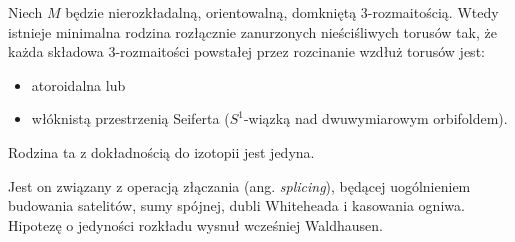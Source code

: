 \begin{proposition}
    Niech $M$ będzie nierozkładalną, orientowalną, domkniętą 3-rozmaitością.
    Wtedy istnieje minimalna rodzina rozłącznie zanurzonych nieściśliwych torusów tak, że każda składowa 3-rozmaitości powstałej przez rozcinanie wzdłuż torusów jest:
    \begin{itemize}
        \item atoroidalna lub
    \item włóknistą przestrzenią Seiferta ($S^1$-wiązką nad dwuwymiarowym orbifoldem).    \end{itemize}
%
%
%
%
%
    Rodzina ta z dokładnością do izotopii jest jedyna.
\end{proposition}

Jest on związany z operacją złączania (ang. \emph{splicing}), będącej uogólnieniem budowania satelitów, sumy spójnej, dubli Whiteheada i kasowania ogniwa.
%
Hipotezę o jedyności rozkładu wysnuł wcześniej Waldhausen.
%


